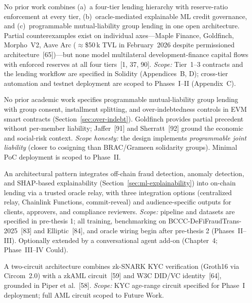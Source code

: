 \documentclass[12pt, a4paper]{report}
\begin{document}
\begin{description}[leftmargin=0pt]

\item[\textbf{Contribution 1 --- Four-Tier Hierarchical DeFi Architecture.}]
No prior work combines (a)~a four-tier lending hierarchy with reserve-ratio enforcement at every tier, (b)~oracle-mediated explainable ML credit governance, and (c)~programmable mutual-liability group lending in one open architecture. Partial counterexamples exist on individual axes---Maple Finance, Goldfinch, Morpho~V2, Aave Arc ($\approx$\$50\,k TVL in February~2026 despite permissioned architecture~[65])---but none model multilateral development-finance capital flows with enforced reserves at all four tiers~[1, 37, 90]. \textit{Scope:} Tier~1--3 contracts and the lending workflow are specified in Solidity (Appendices~B, D); cross-tier automation and testnet deployment are scoped to Phases~I--II (Appendix~C).

\item[\textbf{Contribution 2 --- On-Chain Solidarity Group Lending.}]
No prior academic work specifies programmable mutual-liability group lending with group consent, installment splitting, and over-indebtedness controls in EVM smart contracts (Section~\ref{sec:over-indebt}). Goldfinch provides partial precedent without per-member liability; Jaffer~[91] and Sherratt~[92] ground the economic and social-risk context. \textit{Scope honesty:} the design implements \textit{programmable joint liability} (closer to cosigning than BRAC/Grameen solidarity groups). Minimal PoC deployment is scoped to Phase~II.

\item[\textbf{Contribution 3 --- Oracle-Mediated AI/ML Integration with Explainability.}]
An architectural pattern integrates off-chain fraud detection, anomaly detection, and SHAP-based explainability (Section~\ref{sec:ml-explainability}) into on-chain lending via a trusted oracle relay, with three integration options (centralized relay, Chainlink Functions, commit-reveal) and audience-specific outputs for clients, approvers, and compliance reviewers. \textit{Scope:} pipeline and datasets are specified in pre-thesis 1; all training, benchmarking on BCCC-DeFiFraudTrans-2025~[83] and Elliptic~[84], and oracle wiring begin after pre-thesis 2 (Phases~II--III). Optionally extended by a conversational agent add-on (Chapter~4; Phase~III--IV Could).

\item[\textbf{Contribution 4 --- Compliance-Aware ZKP Identity Pathway.}]
A two-circuit architecture combines zk-SNARK KYC verification (Groth16 via Circom~2.0) with a zkAML circuit~[59] and W3C DID/VC identity~[64], grounded in Piper et al.~[58]. \textit{Scope:} KYC age-range circuit specified for Phase~I deployment; full AML circuit scoped to Future Work.

\end{description}
\end{document}

